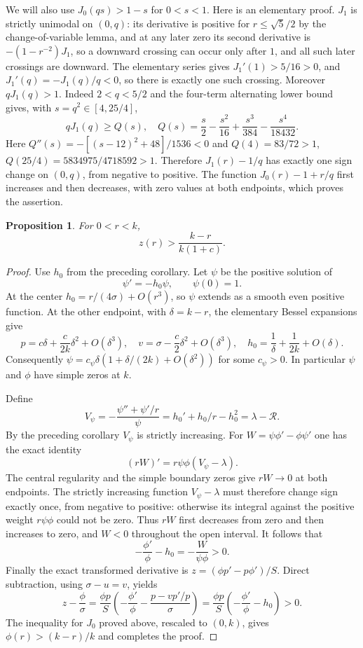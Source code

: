 \documentclass[11pt]{article}
\newtheorem{proposition}[theorem]{Proposition}
\theoremstyle{remark}
\begin{document}
We will also use $J_0(qs)>1-s$ for $0<s<1$. Here is an elementary proof.
$J_1$ is strictly unimodal on $(0,q)$: its derivative is positive
for $r\le\sqrt5/2$ by the change-of-variable lemma, and at any later zero its
second derivative is $-(1-r^{-2})J_1$, so a downward crossing
can occur only after $1$, and all such later crossings are downward.
The elementary series gives $J_1'(1)>5/16>0$, and
$J_1'(q)=-J_1(q)/q<0$, so there is exactly one such crossing.
Moreover $qJ_1(q)>1$.
Indeed $2<q<5/2$ and the four-term alternating lower bound gives,
with $s=q^2\in[4,25/4]$,
\[
 qJ_1(q)\ge Q(s),\quad
 Q(s)=\frac s2-\frac{s^2}{16}+\frac{s^3}{384}
                                      -\frac{s^4}{18432}.
\]
Here $Q''(s)=-[(s-12)^2+48]/1536<0$ and
$Q(4)=83/72>1$, $Q(25/4)=5834975/4718592>1$.
Therefore $J_1(r)-1/q$ has exactly one sign change on $(0,q)$,
from negative to positive.  The function $J_0(r)-1+r/q$ first
increases and then decreases, with zero values at both endpoints,
which proves the assertion.

\begin{proposition}
For $0<r<k$,
\[
 z(r)>\frac{k-r}{k(1+c)}.
\]
\end{proposition}
\begin{proof}
Use $h_0$ from the preceding corollary.
Let $\psi$ be the positive solution of
\[
 \psi'=-h_0\psi,\qquad \psi(0)=1.
\]
At the center $h_0=r/(4\sigma)+O(r^3)$, so $\psi$ extends as a smooth
even positive function.  At the other endpoint, with $\delta=k-r$,
the elementary Bessel expansions give
\[
 p=c\delta+\frac{c}{2k}\delta^2+O(\delta^3),\quad
 v=\sigma-\frac c2\delta^2+O(\delta^3),\quad
 h_0=\frac1\delta+\frac1{2k}+O(\delta).
\]
Consequently $\psi=c_\psi\delta(1+\delta/(2k)+O(\delta^2))$ for
some $c_\psi>0$.  In particular $\psi$ and $\phi$ have simple zeros
at $k$.

Define
\[
 V_\psi=-\frac{\psi''+\psi'/r}{\psi}
       =h_0'+h_0/r-h_0^2=\lambda-\mathcal R.
\]
By the preceding corollary $V_\psi$ is strictly increasing.
For $W=\psi\phi'-\phi\psi'$ one has the exact identity
\[
 (rW)'=r\psi\phi(V_\psi-\lambda).
\]
The central regularity and the simple boundary zeros give
$rW\to0$ at both endpoints.  The strictly increasing function
$V_\psi-\lambda$ must therefore change sign exactly once,
from negative to positive: otherwise its integral against the
positive weight $r\psi\phi$ could not be zero.  Thus $rW$
first decreases from zero and then increases to zero, and
$W<0$ throughout the open interval.  It follows that
\[
 -\frac{\phi'}\phi-h_0=-\frac W{\psi\phi}>0.
\]
Finally the exact transformed derivative is
$z=(\phi p'-p\phi')/S$.  Direct subtraction, using
$\sigma-u=v$, yields
\[
 z-\frac{\phi}{\sigma}
 =\frac{\phi p}{S}
       \left(-\frac{\phi'}\phi-\frac{p-vp'/p}{\sigma}\right)
 =\frac{\phi p}{S}
       \left(-\frac{\phi'}\phi-h_0\right)>0.
\]
The inequality for $J_0$ proved above, rescaled to $(0,k)$, gives
$\phi(r)>(k-r)/k$ and completes the proof.
\end{proof}
\end{document}
